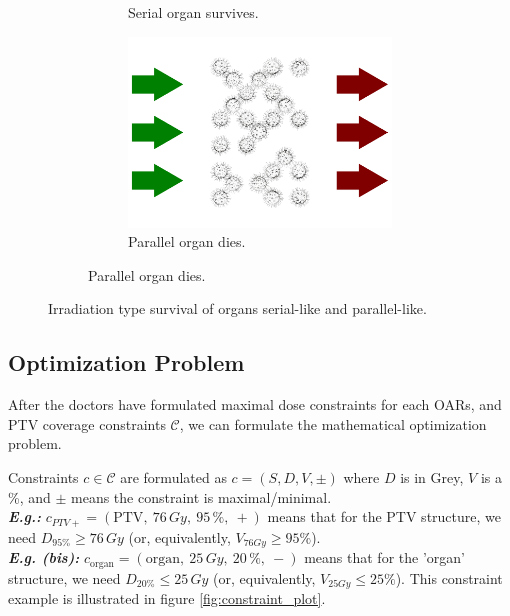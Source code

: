 \begin{figure}
\begin{subfigure}[b]{0.48\textwidth}
\begin{subfigure}[b]{0.55\textwidth}
			\vspace{0.5mm}
			\caption{Serial organ survives.}
		\end{subfigure}
		\vbar
		\begin{subfigure}[b]{0.35\textwidth}
			\addtocounter{subfigure}{-1}
			\renewcommand\thesubfigure{\alph{subfigure}2}
			\centering
			\includegraphics[width=\textwidth]{parallel_heat_square_post.pdf}
			\caption{Parallel organ dies.}
		\end{subfigure}	
	\end{subfigure}
	\addtocounter{subfigure}{-1}
	\caption{Irradiation type survival of organs serial-like and parallel-like.}
	\label{fig:serial_parallel_organ_radiation}	
\end{figure}

\subsection{Optimization Problem}
After the doctors have formulated maximal dose constraints for each OARs, and PTV coverage constraints $\mathcal{C}$, we can formulate the mathematical optimization problem.

Constraints $c \in \mathcal{C}$ are formulated as $c = \left( S, D, V, \pm \right)$ where $D$ is in Grey, $V$ is a \%, and $\pm$ means the constraint is maximal/minimal.
\\
\textit{\textbf{E.g.:}} $c_{PTV+} = \left( \text{PTV}, \ 76\,Gy, \ 95\,\%, \ + \right)$ means that for the PTV structure, we need $D_{95\%} \geq 76\,\textit{Gy}$ (or, equivalently, $V_{76\textit{Gy}} \geq 95 \%$).
\\
\textit{\textbf{E.g. (bis):}} $c_{\text{organ}} = \left( \text{organ}, \ 25\, Gy, \ 20\,\%, \ - \right)$ means that for the 'organ' structure, we need $D_{20\%} \leq 25\,\textit{Gy}$ (or, equivalently, $V_{25\textit{Gy}} \leq 25 \%$).
This constraint example is illustrated in figure \ref{fig:constraint_plot}.

